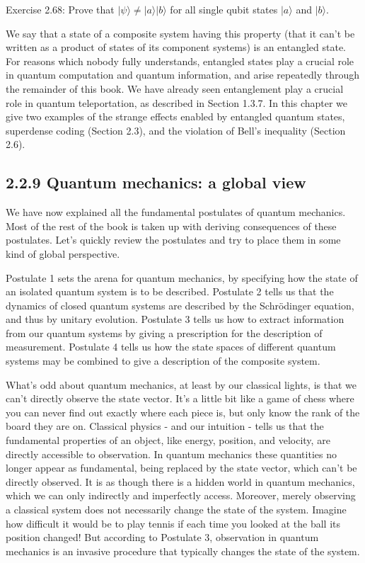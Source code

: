 \documentclass[10pt]{article}
\begin{document}
Exercise 2.68: Prove that $|\psi\rangle \neq|a\rangle|b\rangle$ for all single qubit states $|a\rangle$ and $|b\rangle$.

We say that a state of a composite system having this property (that it can't be written as a product of states of its component systems) is an entangled state. For reasons which nobody fully understands, entangled states play a crucial role in quantum computation and quantum information, and arise repeatedly through the remainder of this book. We have already seen entanglement play a crucial role in quantum teleportation, as described in Section 1.3.7. In this chapter we give two examples of the strange effects enabled by entangled quantum states, superdense coding (Section 2.3), and the violation of Bell's inequality (Section 2.6).

\subsection*{2.2.9 Quantum mechanics: a global view}
We have now explained all the fundamental postulates of quantum mechanics. Most of the rest of the book is taken up with deriving consequences of these postulates. Let's quickly review the postulates and try to place them in some kind of global perspective.

Postulate 1 sets the arena for quantum mechanics, by specifying how the state of an isolated quantum system is to be described. Postulate 2 tells us that the dynamics of closed quantum systems are described by the Schrödinger equation, and thus by unitary evolution. Postulate 3 tells us how to extract information from our quantum systems by giving a prescription for the description of measurement. Postulate 4 tells us how the state spaces of different quantum systems may be combined to give a description of the composite system.

What's odd about quantum mechanics, at least by our classical lights, is that we can't directly observe the state vector. It's a little bit like a game of chess where you can never find out exactly where each piece is, but only know the rank of the board they are on. Classical physics - and our intuition - tells us that the fundamental properties of an object, like energy, position, and velocity, are directly accessible to observation. In quantum mechanics these quantities no longer appear as fundamental, being replaced by the state vector, which can't be directly observed. It is as though there is a hidden world in quantum mechanics, which we can only indirectly and imperfectly access. Moreover, merely observing a classical system does not necessarily change the state of the system. Imagine how difficult it would be to play tennis if each time you looked at the ball its position changed! But according to Postulate 3, observation in quantum mechanics is an invasive procedure that typically changes the state of the system.
\end{document}
